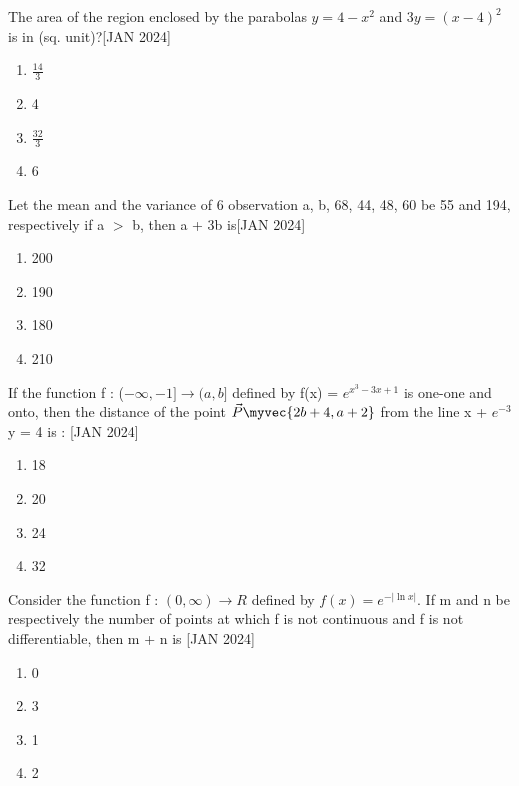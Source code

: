     \bigskip
    \item The area of the region enclosed by the parabolas $y = 4 - x^2$ and $3y = (x - 4)^2$ is in (sq. unit)?\hfill{[JAN 2024]}
    \begin{multicols}{4}
    \begin{enumerate}
        \item $\frac{14}{3}$
        \item 4
        \item $\frac{32}{3}$
        \item 6
    \end{enumerate} 
    \end{multicols}
    \bigskip
    \item Let the mean and the variance of 6 observation a, b, 68, 44, 48, 60 be 55 and 194, respectively if a $>$ b, then a + 3b is\hfill{[JAN 2024]}
    \begin{multicols}{4}
    \begin{enumerate}
        \item 200
        \item 190
        \item 180
        \item 210
    \end{enumerate} 
    \end{multicols}
    \bigskip
    \item If the function f : ($-\infty , -1] \rightarrow (a , b]$ defined by f(x) = $e^{x^3 -3x + 1}$ is one-one and onto, then the distance of the point $\vec{P}\myvec{2b + 4, a + 2}$ from the line x + $ e^{-3} $y = 4 is :  \hfill{[JAN 2024]}
    \begin{multicols}{4}
    \begin{enumerate}
        \item 18
        \item 20
        \item 24
        \item 32
    \end{enumerate} 
    \end{multicols}
    \bigskip
    \item Consider the function f : $(0 , \infty) \rightarrow R$ defined by $f (x) = e^{-|\ln{x}|}$. If m and n be respectively the number of points at which f is not continuous and f is not differentiable, then m + n is \hfill{[JAN 2024]} 
    \begin{multicols}{4}
    \begin{enumerate}
        \item 0
        \item 3
        \item 1
        \item 2
    \end{enumerate} 
    \end{multicols}
